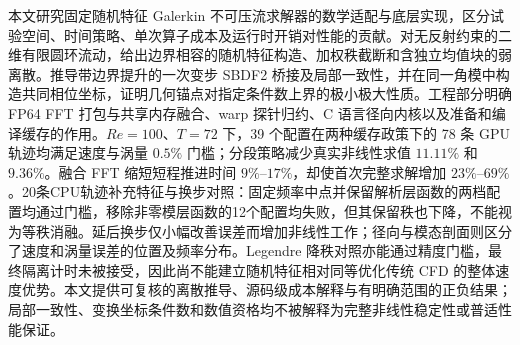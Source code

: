 本文研究固定随机特征 Galerkin 不可压流求解器的数学适配与底层实现，区分试验空间、时间策略、单次算子成本及运行时开销对性能的贡献。对无反射约束的二维有限圆环流动，给出边界相容的随机特征构造、加权秩截断和含独立均值块的弱离散。推导带边界提升的一次变步 SBDF2 桥接及局部一致性，并在同一角模中构造共同相位坐标，证明几何锚点对指定条件数上界的极小极大性质。工程部分明确 FP64 FFT 打包与共享内存融合、warp 探针归约、C 语言径向内核以及准备和编译缓存的作用。\(Re=100\)、\(T=72\) 下，39 个配置在两种缓存政策下的 78 条 GPU 轨迹均满足速度与涡量 \(0.5\%\) 门槛；分段策略减少真实非线性求值 \(11.11\%\) 和 \(9.36\%\)。融合 FFT 缩短短程推进时间 \(9\%\)--\(17\%\)，却使首次完整求解增加 \(23\%\)--\(69\%\)。20条CPU轨迹补充特征与换步对照：固定频率中点并保留解析层函数的两档配置均通过门槛，移除非零模层函数的12个配置均失败，但其保留秩也下降，不能视为等秩消融。延后换步仅小幅改善误差而增加非线性工作；径向与模态剖面则区分了速度和涡量误差的位置及频率分布。Legendre 降秩对照亦能通过精度门槛，最终隔离计时未被接受，因此尚不能建立随机特征相对同等优化传统 CFD 的整体速度优势。本文提供可复核的离散推导、源码级成本解释与有明确范围的正负结果；局部一致性、变换坐标条件数和数值资格均不被解释为完整非线性稳定性或普适性能保证。
